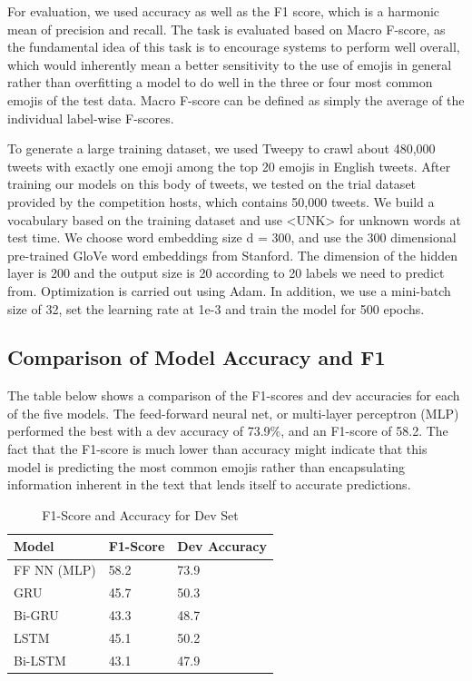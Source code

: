 \documentclass[11pt,a4paper]{article}
\begin{document}
For evaluation, we used accuracy as well as the F1 score, which is a harmonic mean of precision and recall. The task is evaluated based on Macro F-score, as the fundamental idea of this task is to encourage systems to perform well overall, which would inherently mean a better sensitivity to the use of emojis in general rather than overfitting a model to do well in the  three or four most common emojis of the test data. Macro F-score can be defined as simply the average of the individual label-wise F-scores.


\par
To generate a large training dataset, we used Tweepy to crawl about 480,000 tweets with exactly one emoji among the top 20 emojis in English tweets. After training our models on this body of tweets, we tested on the trial dataset provided by the competition hosts, which contains 50,000 tweets. We build a vocabulary based on the training dataset and use <UNK> for unknown words at test time. We choose word embedding size d = 300, and use the 300 dimensional pre-trained GloVe word embeddings from Stanford. The dimension of the hidden layer is 200 and the output size is 20 according to 20 labels we need to predict from. Optimization is carried out using Adam. In addition, we use a mini-batch size of 32, set the learning rate at 1e-3 and train the model for 500 epochs.


\subsection{Comparison of Model Accuracy and F1}
The table below shows a comparison of the F1-scores and dev accuracies for each of the five models. The feed-forward neural net, or multi-layer perceptron (MLP) performed the best with a dev accuracy of 73.9\%, and an F1-score of 58.2. The fact that the F1-score is much lower than accuracy might indicate that this model is predicting the most common emojis rather than encapsulating information inherent in the text that lends itself to accurate predictions.
	\begin{table}[htp]
		\centering
		\caption{F1-Score and Accuracy for Dev Set}
		\label{my-label}
		\begin{tabular}{@{}lll@{}}
			\toprule
			Model       & F1-Score & Dev Accuracy \\ \midrule
			FF NN (MLP) & 58.2     & 73.9         \\
			GRU         & 45.7     & 50.3         \\
			Bi-GRU      & 43.3        & 48.7            \\
			LSTM        & 45.1     & 50.2         \\
			Bi-LSTM     & 43.1       & 47.9            \\ \bottomrule
		\end{tabular}
	\end{table}
\end{document}
